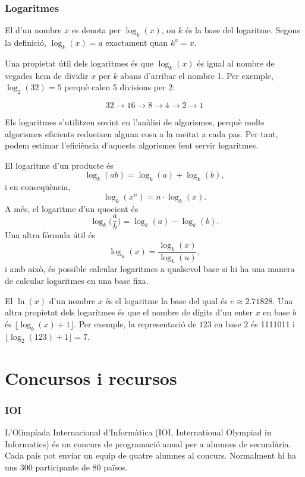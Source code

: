 \subsubsection{Logaritmes}


El  d'un nombre $x$
es denota per $\log_k(x)$, on $k$ és la base
del logaritme.
Segons la definició,
$\log_k(x)=a$ exactament quan $k^a=x$.

Una propietat útil dels logaritmes és
que $\log_k(x)$ és igual al nombre de vegades
hem de dividir $x$ per $k$ abans d'arribar
el nombre 1.
Per exemple, $\log_2(32)=5$
perquè calen 5 divisions per 2:

\[32 \rightarrow 16 \rightarrow 8 \rightarrow 4 \rightarrow 2 \rightarrow 1 \]

Els logaritmes s'utilitzen sovint en l'anàlisi de
algorismes, perquè molts algorismes eficients
redueixen alguna cosa a la meitat a cada pas.
Per tant, podem estimar l'eficiència d'aquests algorismes
fent servir logaritmes.

El logaritme d'un producte és
\[\log_k(ab) = \log_k(a)+\log_k(b),\]
i en conseqüència,
\[\log_k(x^n) = n \cdot \log_k(x).\]
A més, el logaritme d'un quocient és
\[\log_k\Big(\frac{a}{b}\Big) = \log_k(a)-\log_k(b).\]
Una altra fórmula útil és
\[\log_u(x) = \frac{\log_k(x)}{\log_k(u)},\]
i amb això, és possible calcular
logaritmes a qualsevol base si hi ha una manera de
calcular logaritmes en una base fixa.


El  $\ln(x)$ d'un nombre $x$
és el logaritme la base del qual és $e \approx 2.71828$.
Una altra propietat dels logaritmes és que
el nombre de dígits d'un enter $x$ en base $b$ és
$\lfloor \log_b(x)+1 \rfloor$.
Per exemple, la representació de
$ 123 $ en base $ 2 $ és 1111011 i
$\lfloor \log_2(123)+1 \rfloor = 7$.

\section{Concursos i recursos}

\subsubsection{IOI}

L'Olimpíada Internacional d'Informàtica (IOI,
International Olympiad in Informatics)
és un concurs de programació anual per a
alumnes de secundària.
Cada país pot enviar un equip de
quatre alumnes al concurs.
Normalment hi ha uns 300 participants
de 80 països.

